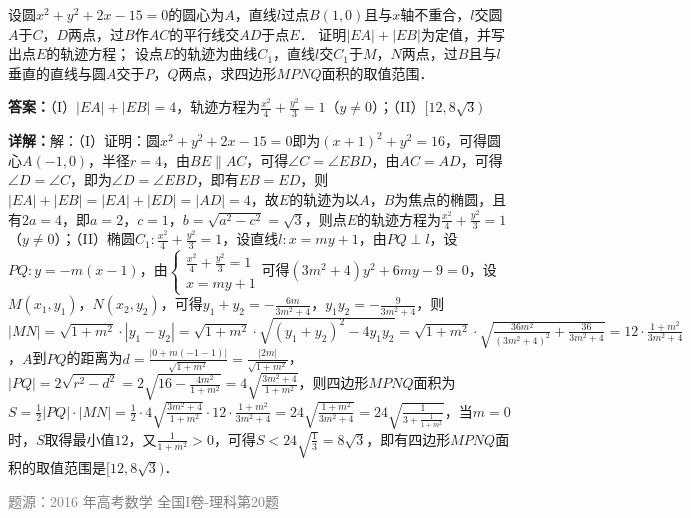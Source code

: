 \begin{question}
设圆$x^2+y^2+2x-15=0$的圆心为$A$，直线$l$过点$B(1,0)$且与$x$轴不重合，$l$交圆$A$于$C$，$D$两点，过$B$作$AC$的平行线交$AD$于点$E$．
证明$|EA|+|EB|$为定值，并写出点$E$的轨迹方程；
设点$E$的轨迹为曲线$C_1$，直线$l$交$C_1$于$M$，$N$两点，过$B$且与$l$垂直的直线与圆$A$交于$P$，$Q$两点，求四边形$MPNQ$面积的取值范围．
\begin{solution}
\textbf{答案：}（I）$|EA|+|EB|=4$，轨迹方程为$\frac{x^2}{4}+\frac{y^2}{3}=1$（$y\neq0$）；（II）$[12,8\sqrt{3})$

\textbf{详解：}解：（I）证明：圆$x^2+y^2+2x-15=0$即为$(x+1)^2+y^2=16$，可得圆心$A(-1,0)$，半径$r=4$，由$BE\parallel AC$，可得$\angle C=\angle EBD$，由$AC=AD$，可得$\angle D=\angle C$，即为$\angle D=\angle EBD$，即有$EB=ED$，则$|EA|+|EB|=|EA|+|ED|=|AD|=4$，故$E$的轨迹为以$A$，$B$为焦点的椭圆，且有$2a=4$，即$a=2$，$c=1$，$b=\sqrt{a^2-c^2}=\sqrt{3}$，则点$E$的轨迹方程为$\frac{x^2}{4}+\frac{y^2}{3}=1$（$y\neq0$）；（II）椭圆$C_1:\frac{x^2}{4}+\frac{y^2}{3}=1$，设直线$l:x=my+1$，由$PQ\perp l$，设$PQ:y=-m(x-1)$，由$\begin{cases}\frac{x^2}{4}+\frac{y^2}{3}=1\\x=my+1\end{cases}$可得$(3m^2+4)y^2+6my-9=0$，设$M(x_1,y_1)$，$N(x_2,y_2)$，可得$y_1+y_2=-\frac{6m}{3m^2+4}$，$y_1y_2=-\frac{9}{3m^2+4}$，则$|MN|=\sqrt{1+m^2}\cdot|y_1-y_2|=\sqrt{1+m^2}\cdot\sqrt{(y_1+y_2)^2-4y_1y_2}=\sqrt{1+m^2}\cdot\sqrt{\frac{36m^2}{(3m^2+4)^2}+\frac{36}{3m^2+4}}=12\cdot\frac{1+m^2}{3m^2+4}$，$A$到$PQ$的距离为$d=\frac{|0+m(-1-1)|}{\sqrt{1+m^2}}=\frac{|2m|}{\sqrt{1+m^2}}$，$|PQ|=2\sqrt{r^2-d^2}=2\sqrt{16-\frac{4m^2}{1+m^2}}=4\sqrt{\frac{3m^2+4}{1+m^2}}$，则四边形$MPNQ$面积为$S=\frac{1}{2}|PQ|\cdot|MN|=\frac{1}{2}\cdot4\sqrt{\frac{3m^2+4}{1+m^2}}\cdot12\cdot\frac{1+m^2}{3m^2+4}=24\sqrt{\frac{1+m^2}{3m^2+4}}=24\sqrt{\frac{1}{3+\frac{1}{1+m^2}}}$，当$m=0$时，$S$取得最小值$12$，又$\frac{1}{1+m^2}>0$，可得$S<24\sqrt{\frac{1}{3}}=8\sqrt{3}$，即有四边形$MPNQ$面积的取值范围是$[12,8\sqrt{3})$．

\textcolor{gray}{\footnotesize 题源：2016 年高考数学 全国I卷-理科第20题}
\end{solution}
\end{question}

